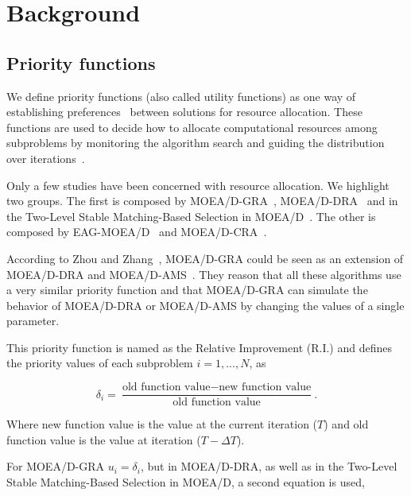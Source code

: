 \section{Background}

\subsection{Priority functions}

We define priority functions (also called utility functions) as one way of establishing preferences~\cite{chankong1983multiobjective} between solutions for resource allocation. These functions are used to decide how to allocate computational resources among subproblems by monitoring the algorithm search and guiding the distribution over iterations~\cite{cai2015external}. 

Only a few studies have been concerned with resource allocation. We highlight two groups. The first is composed by MOEA/D-GRA~\cite{zhou2016all}, MOEA/D-DRA~\cite{zhang2009performance} and in the Two-Level Stable Matching-Based Selection in MOEA/D~\cite{nasir2011improved}. The other is composed by EAG-MOEA/D~\cite{cai2015external} and MOEA/D-CRA~\cite{kang2018collaborative}.

According to Zhou and Zhang~\cite{zhou2016all}, MOEA/D-GRA could be seen as an extension of MOEA/D-DRA and MOEA/D-AMS~\cite{chiang2011moea}. They reason that all these algorithms use a very similar priority function and that MOEA/D-GRA can simulate the behavior of MOEA/D-DRA or MOEA/D-AMS by changing the values of a single parameter. 

This priority function is named as the Relative Improvement (R.I.) and defines the priority values of each subproblem $i=1,...,N$, as

\begin{equation}\label{priority}
	\delta_i = \dfrac{\text{old function value}-\text{new function value}}{\text{old function value}}.
\end{equation}

Where new function value is the value at the current iteration ($T$) and old function value is the value at iteration ($T - \Delta T$).

For MOEA/D-GRA $u_i = \delta_i$, but in MOEA/D-DRA, as well as in the Two-Level Stable Matching-Based Selection in MOEA/D, a second equation is used,

